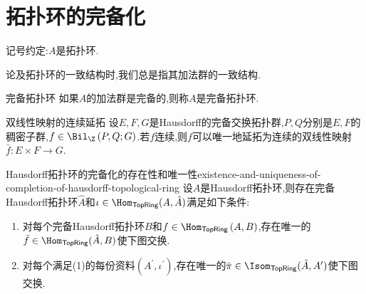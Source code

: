 \section{拓扑环的完备化}

记号约定:$A$是拓扑环.

\begin{convention}{}{}
	论及拓扑环的一致结构时,我们总是指其加法群的一致结构.
\end{convention}

\begin{definition}{完备拓扑环}{}
	如果$A$的加法群是完备的,则称$A$是完备拓扑环.	
\end{definition}

\begin{theorem}{双线性映射的连续延拓}{}
	设$E,F,G$是Hausdorff的完备交换拓扑群,$P,Q$分别是$E,F$的稠密子群,$f\in\Bil_{\Z}\left(P,Q;G\right)$.若$f$连续,则$f$可以唯一地延拓为连续的双线性映射$\bar{f}:E\times F\to G$.
\end{theorem}

\begin{proposition}{Hausdorff拓扑环的完备化的存在性和唯一性}{existence-and-uniqueness-of-completion-of-hausdorff-topological-ring}
	设$A$是Hausdorff拓扑环,则存在完备Hausdorff拓扑环$\hat{A}$和$\iota\in\Hom_{\mathsf{TopRing}}(A,\hat{A})$满足如下条件:
	\begin{enumerate}
		\item 对每个完备Hausdorff拓扑环$B$和$f\in\Hom_{\mathsf{TopRing}}\left(A,B\right)$,存在唯一的$\bar{f}\in\Hom_{\mathsf{TopRing}}(\hat{A},B)$使下图交换.
		\begin{center}
		\end{center}
		\item 对每个满足(1)的每份资料$\left(A^{\prime},\iota^{\prime}\right)$,存在唯一的$\bar{\pi}\in\Isom_{\mathsf{TopRing}}(\hat{A},A^{\prime})$使下图交换.
		\begin{center}
		\end{center}
	\end{enumerate}
\end{proposition}

